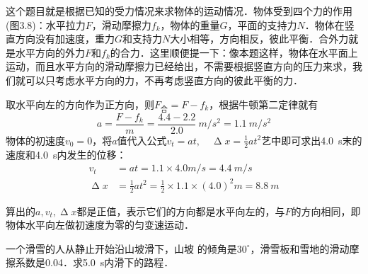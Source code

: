 \begin{Test}
\begin{Answer}
    这个题目就是根据已知的受力情况来求物体的运动情况．物体受到四个力的作用(图3.8)：水平拉力$F$，滑动摩擦力$f_k$，物体的重量$G$，平面的支持力$N$．物体在竖直方向没有加速度，重力$G$和支持力$N$大小相等，方向相反，彼此平衡．合外力就是水平方向的外力$F$和$f_k$的合力．这里顺便提一下：像本题这样，物体在水平面上运动，而且水平方向的滑动摩擦力已经给出，不需要根据竖直方向的压力来求，我们就可以只考虑水平方向的力，不再考虑竖直方向的彼此平衡的力．

    取水平向左的方向作为正方向，则$F_{\text{合}}=F-f_k$，根据牛顿第二定律就有
    \[a=\frac{F-f_k}{m}=\frac{4.4-2.2}{2.0}~\si{m/s^2}=\SI{1.1}{m/s^2} \]
    物体的初速度$v_0=0$，将$a$值代入公式$v_t=at,\quad \upDelta x=\frac{1}{2}at^2$艺中即可求出\SI{4.0}{s}末的速度和\SI{4.0}{s}内发生的位移：
    \[\begin{split}
            v_t        & =at=1.1\times 4.0\si{m/s} =\SI{4.4}{m/s}                                \\
            \upDelta x & =\frac{1}{2}at^2=\frac{1}{2}\times 1.1\times (4.0)^2 \si{m}=\SI{8.8}{m}
        \end{split} \]
\end{Answer}
算出的$a,v_t,\upDelta x$都是正值，表示它们的方向都是水平向左的，与$F$的方向相同，即物体水平向左做初速度为零的匀变速运动．

\begin{Example}
    一个滑雪的人从静止开始沿山坡滑下，山坡
    的倾角是$30^\circ$，滑雪板和雪地的滑动摩擦系数是0.04．求\SI{5.0}{s}内滑下的路程．
\end{Example}


\end{Test}
